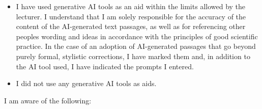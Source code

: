 \documentclass[a4paper,10pt,xcolor=dvipsnames]{article}
\begin{document}
\def\LayoutCheckField#1#2{%
  #2 #1%
}

\begin{itemize}[labelwidth=0.65cm,align=parleft]
    \item[\mbox{\begin{Form}\CheckBox[height=0.2cm, width=0.2cm]{}\end{Form}}] I have used generative AI tools as an aid within the limits allowed by the lecturer. I understand that I am solely responsible for the accuracy of the content of the AI-generated text passages, as well as for referencing other people\textquotesingle s wording and ideas in accordance with the principles of good scientific practice. In the case of an adoption of AI-generated passages that go beyond purely formal, stylistic corrections, I have marked them and, in addition to the AI tool used, I have indicated the prompts I entered.
    
        
    \item[\mbox{\begin{Form}\CheckBox[height=0.2cm, width=0.2cm]{}\end{Form}}]I did not use any generative AI tools as aids.
\end{itemize}




\newpage

\thispagestyle{page2}

I am aware of the following:
\end{document}

